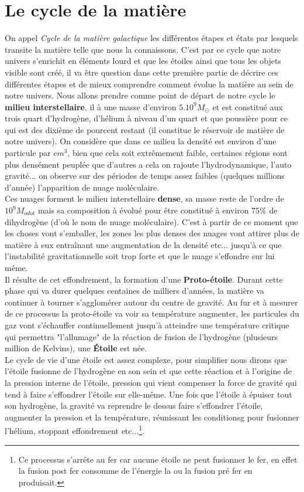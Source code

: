 \documentclass[11pt]{book} %
\begin{document}
\section{Le cycle de la matière}
On appel \textit{Cycle de la matière galactique} les différentes étapes et états par lesquels transite la matière telle que nous la connaissons. C'est par ce cycle que notre univers s’enrichit en éléments lourd et que les étoiles ainsi que tous les objets visible sont créé, il va être question dans cette première partie de décrire ces différentes étapes et de mieux comprendre comment évolue la matière au sein de notre univers.
\n
Nous allons prendre comme point de départ de notre cycle le \textbf{milieu interstellaire}, il à une masse d'environ $5.10^{9}M_{\odot}$ et est constitué aux trois quart d'hydrogène, d'hélium à niveau d'un quart et que poussière pour ce qui est des dixième de pourcent restant (il constitue le réservoir de matière de notre univers). On considère que dans ce milieu la densité est environ d'une particule par $cm^3$, bien que cela soit extrêmement faible, certaines régions sont plus densément peuplée que d'autres a cela on rajoute l'hydrodynamique, l'auto gravité... on observe sur des périodes de temps assez faibles (quelques millions d'année) l'apparition de nuage moléculaire.\\ Ces nuages forment le milieu interstellaire \textbf{dense}, sa masse reste de l'ordre de $10^{9}M_{odot}$ mais sa composition à évolué pour être constitué à environ $75\%$ de dihydrogène (d’où le nom de nuage moléculaire). C'est à partir de ce moment que les choses vont s'emballer, les zones les plus denses des nuages vont attirer plus de matière à eux entraînant une augmentation de la densité etc... jusqu’à ce que l'instabilité gravitationnelle soit trop forte et que le nuage s’effondre sur lui même.\\
Il résulte de cet effondrement, la formation d'une \textbf{Proto-étoile}. Durant cette phase qui va durer quelques centaines de milliers d'années, la matière va continuer à tourner s'agglomérer autour du centre de gravité. Au fur et à mesurer de ce processus la proto-étoile va voir sa température augmenter, les particules du gaz vont s'échauffer continuellement jusqu’à atteindre une température critique qui permettra "l'allumage" de la réaction de fusion de l'hydrogène (plusieurs million de Kelvins), une \textbf{Étoile} est née.\\
Le cycle de vie d'une étoile est assez complexe, pour simplifier nous dirons que l'étoile fusionne de l’hydrogène en son sein et que cette réaction et à l'origine de la pression interne de l'étoile, pression qui vient compenser la force de gravité qui tend à faire s’effondrer l'étoile sur elle-même. Une fois que l'étoile à épuiser tout son hydrogène, la gravité va reprendre le dessus faire s’effondrer l'étoile, augmenter la pression et la température, réunissant les conditionsg pour fusionner l'hélium, stoppant effondrement etc...\footnote{Ce processus s’arrête au fer car aucune étoile ne peut fusionner le fer, en effet la fusion post fer consomme de l'énergie la ou la fusion pré fer en produisait.}.\\
\end{document}

